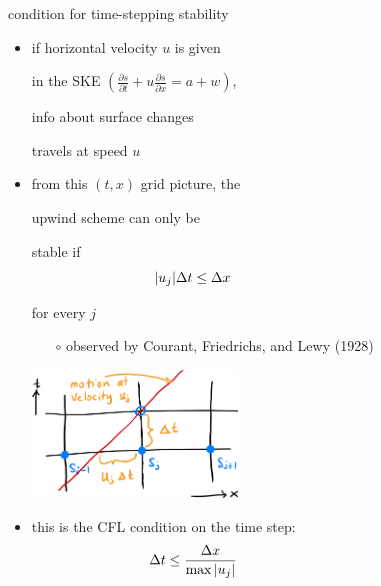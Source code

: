 \documentclass[10pt,dvipsnames]{beamer}
\begin{document}
\begin{frame}{condition for time-stepping stability}

\bigskip\medskip
\begin{itemize}
\item if horizontal velocity $u$ is given

in the SKE $\left(\frac{\partial s}{\partial t} + u \frac{\partial s}{\partial x} = a + w\right)$,

info about surface changes

travels at speed $u$
\item from this $(t,x)$ grid picture, the

upwind scheme can only be

stable if
$$|u_j| \Delta t \le \Delta x \hspace{40mm}$$

for every $j$
    \begin{itemize}
    \item[$\circ$] observed by Courant, Friedrichs, and Lewy (1928)
    \end{itemize}

\vspace{-45mm}
\hfill \includegraphics[width=0.43\textwidth]{cfl.png}

\vspace{15mm}
\item this is the \alert{CFL condition} on the time step:
$$\Delta t \le \frac{\Delta x}{\max |u_j|} \hspace{40mm}$$
\end{itemize}
\end{frame}
\end{document}
